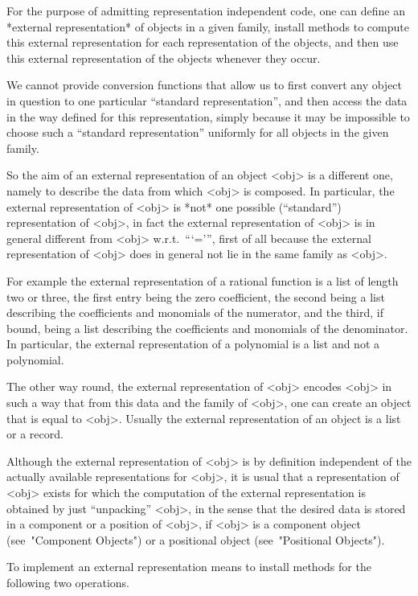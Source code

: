 For the purpose of admitting representation independent code,
one can define an *external representation* of objects in a given family,
install methods to compute this external representation for each
representation of the objects,
and then use this external representation of the objects whenever they
occur.

We cannot provide conversion functions that allow us to first convert
any object in question to one particular ``standard representation'',
and then access the data in the way defined for this representation,
simply because it may be impossible to choose such a ``standard
representation'' uniformly for all objects in the given family.

So the aim of an external representation of an object <obj> is a
different one, namely to describe the data from which <obj> is composed.
In particular, the external representation of <obj> is *not* one possible
(``standard'') representation of <obj>,
in fact the external representation of <obj> is in general different
from <obj> w.r.t.~```=''',
first  of all because the external representation of <obj> does in general
not lie in the same family as <obj>.

For example the external representation of a rational function is a list
of length two or three, the first entry being the zero coefficient,
the second being a list describing the coefficients and monomials of the
numerator, and the third, if bound, being a list describing the coefficients
and monomials of the denominator.
In particular, the external representation of a polynomial is a list
and not a polynomial.

The other way round, the external representation of <obj> encodes <obj>
in such a way that from this data and the family of <obj>,
one can create an object that is equal to <obj>.
Usually the external representation of an object is a list or a record.

Although the external representation of <obj> is by definition independent
of the actually available representations for <obj>,
it is usual that a representation of <obj> exists for which the
computation of the external representation is obtained by just
``unpacking'' <obj>,
in the sense that the desired data is stored in a component or a position
of <obj>, if <obj> is a component object (see~"Component Objects")
or a positional object (see~"Positional Objects").

To implement an external representation means to install methods for the
following two operations.

